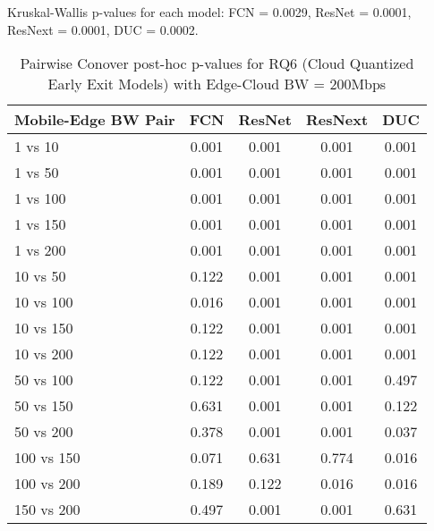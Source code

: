 \begin{table}[h]
\centering
\caption{Pairwise Conover post-hoc p-values for RQ6 (Cloud Quantized Early Exit Models) with Edge-Cloud BW = 200Mbps}
\label{tab:conover_cloud_quantized_earlyexit_ec200}
\smallskip
Kruskal-Wallis p-values for each model: FCN = 0.0029, ResNet = 0.0001, ResNext = 0.0001, DUC = 0.0002.

\begin{tabular}{lcccc}
\toprule
Mobile-Edge BW Pair & FCN & ResNet & ResNext & DUC \\
\midrule
1 vs 10 & 0.001 & 0.001 & 0.001 & 0.001 \\
1 vs 50 & 0.001 & 0.001 & 0.001 & 0.001 \\
1 vs 100 & 0.001 & 0.001 & 0.001 & 0.001 \\
1 vs 150 & 0.001 & 0.001 & 0.001 & 0.001 \\
1 vs 200 & 0.001 & 0.001 & 0.001 & 0.001 \\
10 vs 50 & 0.122 & 0.001 & 0.001 & 0.001 \\
10 vs 100 & 0.016 & 0.001 & 0.001 & 0.001 \\
10 vs 150 & 0.122 & 0.001 & 0.001 & 0.001 \\
10 vs 200 & 0.122 & 0.001 & 0.001 & 0.001 \\
50 vs 100 & 0.122 & 0.001 & 0.001 & 0.497 \\
50 vs 150 & 0.631 & 0.001 & 0.001 & 0.122 \\
50 vs 200 & 0.378 & 0.001 & 0.001 & 0.037 \\
100 vs 150 & 0.071 & 0.631 & 0.774 & 0.016 \\
100 vs 200 & 0.189 & 0.122 & 0.016 & 0.016 \\
150 vs 200 & 0.497 & 0.001 & 0.001 & 0.631 \\
\bottomrule
\end{tabular}
\end{table}

